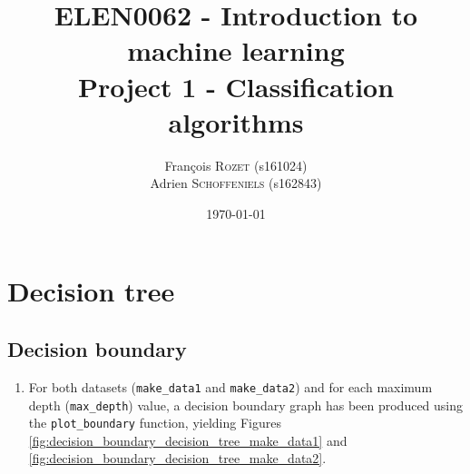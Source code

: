 \documentclass[a4paper, 12pt]{article}
\title{\vspace{-2cm}\textsc{ELEN0062} - Introduction to machine learning\\Project 1 - Classification algorithms}
\author{
François \textsc{Rozet} (s161024)\\
Adrien \textsc{Schoffeniels} (s162843)\\
}
\date{\today}
\begin{document}
	\maketitle
	\section{Decision tree}
	\subsection{Decision boundary}
    \begin{enumerate}[label = (\alph*)]
        \item For both datasets (\texttt{make\_data1} and \texttt{make\_data2}) and for each maximum depth (\texttt{max\_depth}) value, a decision boundary graph\footnotemark{} has been produced using the \texttt{plot\_boundary} function, yielding Figures \ref{fig:decision_boundary_decision_tree_make_data1} and \ref{fig:decision_boundary_decision_tree_make_data2}.
        
        

\end{enumerate}
\end{document}
